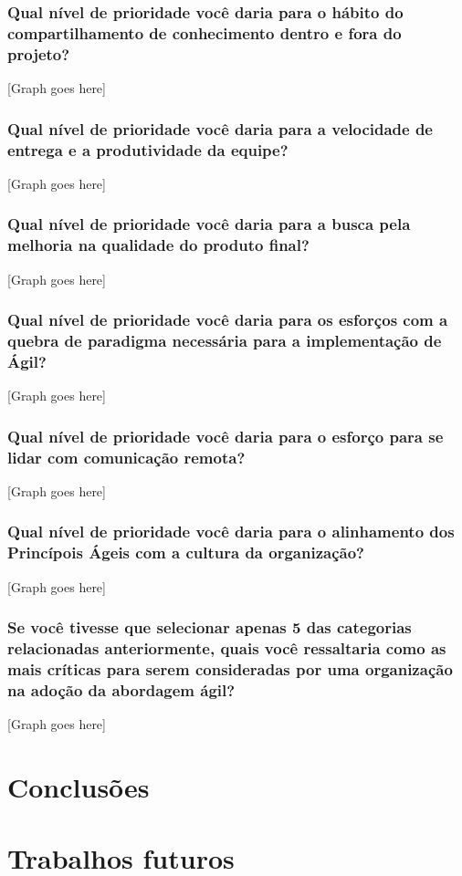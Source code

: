 \subsubsection{Qual nível de prioridade você daria para o hábito do compartilhamento de conhecimento dentro e fora do projeto?}

[Graph goes here]

\subsubsection{Qual nível de prioridade você daria para a velocidade de entrega e a produtividade da equipe?}

[Graph goes here]

\subsubsection{Qual nível de prioridade você daria para a busca pela melhoria na qualidade do produto final?}

[Graph goes here]

\subsubsection{Qual nível de prioridade você daria para os esforços com a quebra de paradigma necessária para a implementação de Ágil?}

[Graph goes here]

\subsubsection{Qual nível de prioridade você daria para o esforço para se lidar com comunicação remota?}

[Graph goes here]

\subsubsection{Qual nível de prioridade você daria para o alinhamento dos Princípois Ágeis com a cultura da organização?}

[Graph goes here]

\subsubsection{Se você tivesse que selecionar apenas 5 das categorias relacionadas anteriormente, quais você ressaltaria como as mais críticas para serem consideradas por uma organização na adoção da abordagem ágil?}

[Graph goes here]

\section{Conclusões}


\section{Trabalhos futuros}
